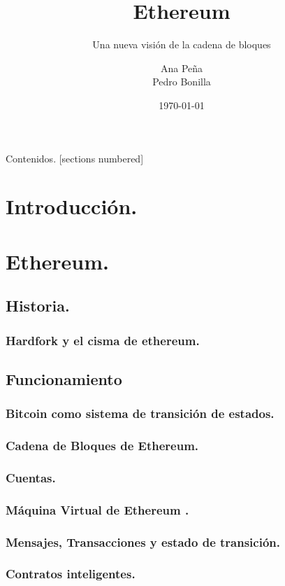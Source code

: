 \documentclass[usenames,dvipsnames]{beamer}
\title{Ethereum}
\subtitle{Una nueva visión de la cadena de bloques}
\date{\today}
\institute{Universidad de Granada}
\author{Ana Peña\\Pedro Bonilla}
\begin{document}
\maketitle
\begin{frame}{Contenidos.}
  [sections numbered]
  \tableofcontents [hideallsubsections]
\end{frame}

\section{ Introducción. }
\section{ Ethereum. }
\subsection{ Historia. }
\subsubsection{ Hardfork y el cisma de ethereum. }
\subsection{ Funcionamiento }

\subsubsection{ Bitcoin como sistema de transición de estados. }
\subsubsection{ Cadena de Bloques de Ethereum. }
\subsubsection{ Cuentas. }
\subsubsection{ Máquina Virtual de Ethereum . }
\subsubsection{ Mensajes, Transacciones y estado de transición. }
\subsubsection{ Contratos inteligentes. }
\end{document}

